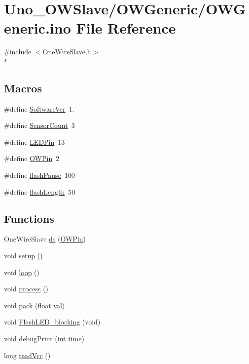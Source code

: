 \hypertarget{OWGeneric_8ino}{\section{Uno\-\_\-\-O\-W\-Slave/\-O\-W\-Generic/\-O\-W\-Generic.ino File Reference}
\label{OWGeneric_8ino}
}
{\ttfamily \#include $<$One\-Wire\-Slave.\-h$>$}\\*
\subsection*{Macros}
\begin{DoxyCompactItemize}
\item 
\#define \hyperlink{OWGeneric_8ino_a53a52b67d1aadf20dbeb5907cf7e86c7}{Software\-Ver}~1.
\item 
\#define \hyperlink{OWGeneric_8ino_ab8efc8d6fc0797bbfe99a0797dd59029}{Sensor\-Count}~3
\item 
\#define \hyperlink{OWGeneric_8ino_abd966e26c1237652c6c1dc46a8f14203}{L\-E\-D\-Pin}~13
\item 
\#define \hyperlink{OWGeneric_8ino_a7f5aa1ac0711ae18877a165a9bf24625}{O\-W\-Pin}~2
\item 
\#define \hyperlink{OWGeneric_8ino_ac71a92c90affb3d6a66641ac05f1545c}{flash\-Pause}~100
\item 
\#define \hyperlink{OWGeneric_8ino_a65b6f41e12d2d8bdbd3416c8db11770e}{flash\-Length}~50
\end{DoxyCompactItemize}
\subsection*{Functions}
\begin{DoxyCompactItemize}
\item 
One\-Wire\-Slave \hyperlink{OWGeneric_8ino_a29dc68449cb5938be210109740e26ce3}{ds} (\hyperlink{OWRain1_8ino_a7f5aa1ac0711ae18877a165a9bf24625}{O\-W\-Pin})
\item 
void \hyperlink{OWGeneric_8ino_a4fc01d736fe50cf5b977f755b675f11d}{setup} ()
\item 
void \hyperlink{OWGeneric_8ino_afe461d27b9c48d5921c00d521181f12f}{loop} ()
\item 
void \hyperlink{OWGeneric_8ino_a2e9c5136d19b1a95fc427e0852deab5c}{process} ()
\item 
void \hyperlink{OWGeneric_8ino_a097292225769f56d224f441fee48cbdb}{pack} (float \hyperlink{Uno__Read__CurrentTransformer__SCT__013__030_8ino_aa0ccb5ee6d882ee3605ff47745c6467b}{val})
\item 
void \hyperlink{OWGeneric_8ino_a4833df7e1a798440cec59dfdf6d1eaf9}{Flash\-L\-E\-D\-\_\-blocking} (void)
\item 
void \hyperlink{OWGeneric_8ino_aea2efd3e27dd82d17fd923d99287f981}{debug\-Print} (int time)
\item 
long \hyperlink{OWGeneric_8ino_a8e23c9421f6663303ea22e4969e2f6c1}{read\-Vcc} ()
\end{DoxyCompactItemize}
